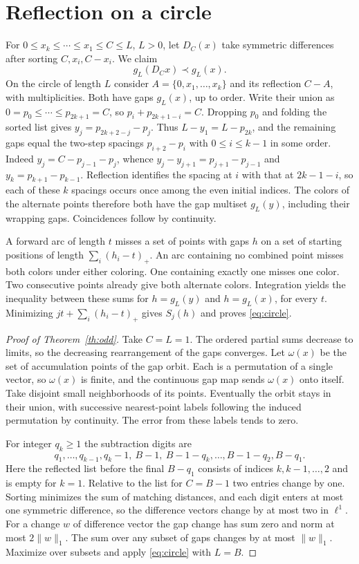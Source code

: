 \documentclass[11pt,reqno]{amsart}
\begin{document}
\section{Reflection on a circle}
For $0\le x_k\le\cdots\le x_1\le C\le L$, $L>0$, let $D_C(x)$ take
symmetric differences after sorting $C,x_i,C-x_i$. We claim
\begin{equation}\label{eq:circle}
 g_L(D_Cx)\prec g_L(x).
\end{equation}
On the circle of length $L$ consider $A=\{0,x_1,\ldots,x_k\}$ and its
reflection $C-A$, with multiplicities. Both have gaps $g_L(x)$, up to order.
Write their union as $0=p_0\le\cdots\le p_{2k+1}=C$, so
$p_i+p_{2k+1-i}=C$. Dropping $p_0$ and folding the sorted list gives
$y_j=p_{2k+2-j}-p_j$. Thus $L-y_1=L-p_{2k}$, and the remaining
gaps equal the two-step spacings $p_{i+2}-p_i$ with $0\le i\le k-1$
in some order. Indeed $y_j=C-p_{j-1}-p_j$, whence
$y_j-y_{j+1}=p_{j+1}-p_{j-1}$ and $y_k=p_{k+1}-p_{k-1}$.
Reflection identifies the spacing at $i$ with that at $2k-1-i$,
so each of these $k$ spacings occurs once among the even initial indices.
The colors of the alternate points therefore both have the gap multiset
$g_L(y)$, including their wrapping gaps. Coincidences follow by continuity.

A forward arc of length $t$ misses a set of points with gaps $h$ on
a set of starting positions of length $\sum_i(h_i-t)_+$.
An arc containing no combined point misses both colors under either coloring.
One containing exactly one misses one color. Two consecutive points already
give both alternate colors. Integration yields the inequality between these
sums for $h=g_L(y)$ and $h=g_L(x)$, for every $t$. Minimizing
$jt+\sum_i(h_i-t)_+$ gives $S_j(h)$ and proves \eqref{eq:circle}.

\begin{proof}[Proof of Theorem~\ref{th:odd}]
Take $C=L=1$. The ordered partial sums decrease to limits, so the decreasing
rearrangement of the gaps converges. Let $\omega(x)$ be the set of accumulation
points of the gap orbit. Each is a permutation of a single vector, so
$\omega(x)$ is finite, and the continuous gap map sends $\omega(x)$ onto itself.
Take disjoint small neighborhoods of its points. Eventually the orbit stays
in their union, with successive nearest-point labels following the induced
permutation by continuity. The error from these labels tends to zero.

For integer $q_k\ge1$ the subtraction digits are
\begin{equation}\label{eq:borrow}
 q_1,\ldots,q_{k-1},q_k-1,\ B-1,\ B-1-q_k,\ldots,B-1-q_2,B-q_1 .
\end{equation}
Here the reflected list before the final $B-q_1$ consists of indices
$k,k-1,\ldots,2$ and is empty for $k=1$. Relative to the list for $C=B-1$
two entries change by one. Sorting minimizes the sum of matching distances,
and each digit enters at most one symmetric difference, so the difference
vectors change by at most two in $\ell^1$. For a change $w$ of difference
vector the gap change has sum zero and norm at most $2\|w\|_1$. The sum
over any subset of gaps changes by at most $\|w\|_1$. Maximize over subsets
and apply \eqref{eq:circle} with $L=B$.
\end{proof}
\end{document}
